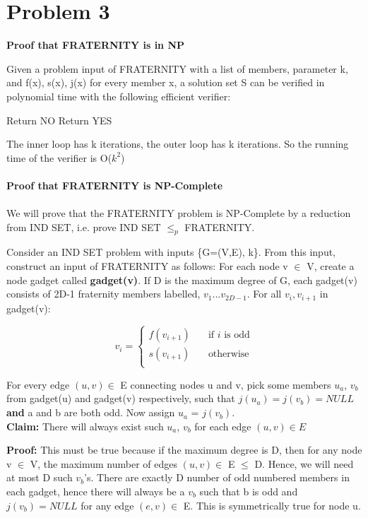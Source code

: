 \section*{Problem 3}

{\bf Proof that FRATERNITY is in NP}

Given a problem input of FRATERNITY with a list of members, parameter
k, and f(x), s(x), j(x) for every member x, a solution set S can be
verified in polynomial time with the following efficient verifier:

\begin{algorithm}[H]
\caption{}
\begin{algorithmic}[1]
\State Return NO
\EndIf
\EndFor
\EndFor
\State Return YES
\end{algorithmic}
\end{algorithm}
The inner loop has k iterations, the outer loop has k
iterations. So the running time of the verifier is O($k^2$)\\
\\
{\bf Proof that FRATERNITY is NP-Complete}\\
\\
We will prove that the FRATERNITY problem is NP-Complete by a
reduction from IND SET, i.e. prove IND SET $\leq_p$ FRATERNITY.

Consider an IND SET problem with inputs \{G=(V,E), k\}. From this input, construct an input of FRATERNITY as follows:
For each node v $\in$ V, create a node gadget called {\bf gadget(v)}. If D is the maximum degree of G, each gadget(v) consists of 2D-1 fraternity members labelled, $v_1$...$v_{2D-1}$. For all $v_i, v_{i+1}$ in gadget(v):

\[
v_i =
    \begin{cases}
        f(v_{i+1}) &\quad \text{if $i$ is odd} \\
        s(v_{i+1}) &\quad \text{otherwise} \\
    \end{cases}
\]

For every edge $(u,v) \in$ E connecting nodes u and v, pick some members $u_a$, $v_b$ from gadget(u) and gadget(v) respectively, such that $j(u_a) = j(v_b) = NULL$ \textbf{and} a and b are both odd. Now assign $u_a$ = $j(v_b)$.\\

\textbf{Claim:} There will always exist such $u_a$, $v_b$ for each edge $(u,v) \in E$

\textbf{Proof:} This must be true because if the maximum degree is D, then for any node v $\in$ V, the maximum number of edges $(u,v) \in$ E $\leq$ D. Hence, we will need at most D such $v_b$'s. There are exactly D number of odd numbered members in each gadget, hence there will always be a $v_b$ such that b is odd and $j(v_b) = NULL$ for any edge $(e,v) \in$ E. This is symmetrically true for node u.\\

